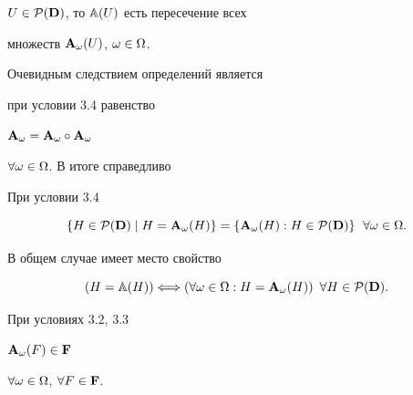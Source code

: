 $U \in {{\cal P}({\bold D})}$, то ${\Bbb A}(U)$ есть пересечение всех


множеств ${{\bold A}_\omega}(U)$, $\omega \in \Omega$.





Очевидным следствием определений является


при условии 3.4 равенство


${{\bold A}_\omega}


= {{\bold A}_\omega} \circ {{\bold A}_\omega}$


$\forall{\omega} \in \Omega$. В итоге справедливо





\begin{props}


При условии $3.4$ 


$$


\{H \in {{\cal P}({\bold D})} \mid


H = {{\bold A}_\omega}(H)\} = \{{{\bold A}_\omega}(H):H \in


{{\cal P}({\bold D})}\}\ \; \fo{\omega} \in \Om.


$$


\end{props}





В общем случае имеет место свойство


$$


(H = {\Bbb A}(H)) \Longleftrightarrow


(\fo{\omega} \in \Om:H = {{\bold A}_\omega}(H)) 


\ \, \fo{H} \in {{\cal P}({\bold D})}.


$$





\begin{props}


При условиях $3.2$, $3.3$


${{\bold A}_\omega}(F) \in {\bold F}$


$\forall{\omega} \in \Omega$, $\forall{F} \in {\bold F}$.


\end{props}





